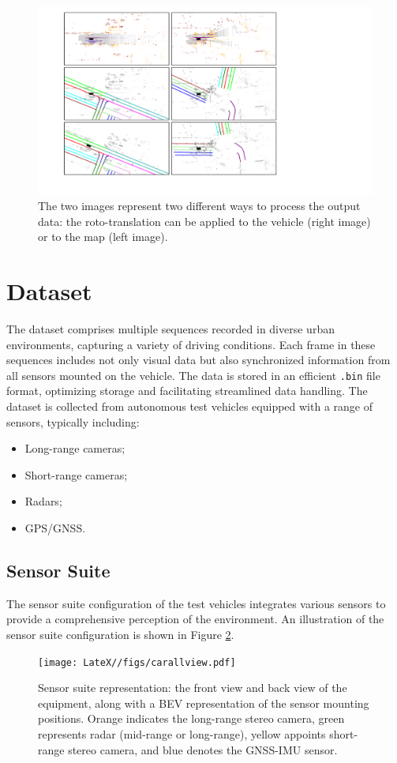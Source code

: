 \begin{figure}[H]
    \centering
    \includegraphics[width=0.85\linewidth]{LateX//figs/post_proc.pdf}
    \caption{The two images represent two different ways to process the output data: the roto-translation can be applied to the vehicle (right image) or to the map (left image).}
    \label{fig:post_processing}
\end{figure}

\section{Dataset}

The dataset comprises multiple sequences recorded in diverse urban environments, capturing a variety of driving conditions. Each frame in these sequences includes not only visual data but also synchronized information from all sensors mounted on the vehicle. The data is stored in an efficient \texttt{.bin} file format, optimizing storage and facilitating streamlined data handling. The dataset is collected from autonomous test vehicles equipped with a range of sensors, typically including:
\begin{itemize}
    \item Long-range cameras;
    \item Short-range cameras;
    \item Radars;
    \item GPS/GNSS.
\end{itemize}

\subsection{Sensor Suite}

The sensor suite configuration of the test vehicles integrates various sensors to provide a comprehensive perception of the environment. An illustration of the sensor suite configuration is shown in Figure \ref{fig:sensor-suite}. 
\begin{figure}[H]
    \centering
    \texttt{[image: LateX//figs/carallview.pdf]}
    \caption{Sensor suite representation: the front view and back view of the equipment, along with a BEV representation of the sensor mounting positions. Orange indicates the long-range stereo camera, green represents radar (mid-range or long-range), yellow appoints short-range stereo camera, and blue denotes the GNSS-IMU sensor.}
    \label{fig:sensor-suite}
\end{figure}

